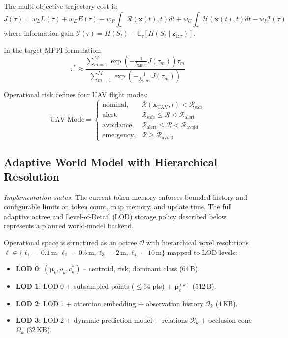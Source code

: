 The multi-objective trajectory cost is:
\begin{equation}
  J(\tau) = w_L L(\tau) + w_E E(\tau) + w_R \int_\tau \mathcal{R}(\mathbf{x}(t), t) dt + w_U \int_\tau \mathcal{U}(\mathbf{x}(t), t) dt - w_I \mathcal{I}(\tau)
\end{equation}
where information gain $\mathcal{I}(\tau) = H(S_t) - \mathbb{E}_\tau[H(S_t \mid \mathbf{z}_{1:\tau})]$.

In the target MPPI formulation:
\begin{equation}
  \tau^* \approx \frac{\sum_{m=1}^M \exp\left(-\frac{1}{\lambda_{\text{MPPI}}} J(\tau_m)\right) \tau_m}{\sum_{m=1}^M \exp\left(-\frac{1}{\lambda_{\text{MPPI}}} J(\tau_m)\right)}
\end{equation}

Operational risk defines four UAV flight modes:
\begin{equation}
  \text{UAV Mode} = \begin{cases}
    \text{nominal}, & \mathcal{R}(\mathbf{x}_{\text{UAV}}, t) < \mathcal{R}_{\text{safe}} \\
    \text{alert}, & \mathcal{R}_{\text{safe}} \le \mathcal{R} < \mathcal{R}_{\text{alert}} \\
    \text{avoidance}, & \mathcal{R}_{\text{alert}} \le \mathcal{R} < \mathcal{R}_{\text{avoid}} \\
    \text{emergency}, & \mathcal{R} \ge \mathcal{R}_{\text{avoid}}
  \end{cases}
\end{equation}

\subsection{Adaptive World Model with Hierarchical Resolution}
\label{subsec:adaptive_world_model}

\emph{Implementation status.} The current token memory enforces bounded history and configurable limits on token count, map memory, and update time. The full adaptive octree and Level-of-Detail (LOD) storage policy described below represents a planned world-model backend.

Operational space is structured as an octree $\mathcal{O}$ with hierarchical voxel resolutions $\ell \in \{\ell_1 = 0.1\,\text{m}, \ell_2 = 0.5\,\text{m}, \ell_3 = 2\,\text{m}, \ell_4 = 10\,\text{m}\}$ mapped to LOD levels:
\begin{itemize}
  \item \textbf{LOD 0}: $(\boldsymbol{\mu}_k, \rho_k, c_k^*)$ -- centroid, risk, dominant class ($64\,\text{B}$).
  \item \textbf{LOD 1}: LOD 0 + subsampled points ($\le 64$ pts) + $\mathbf{p}_c^{(k)}$ ($512\,\text{B}$).
  \item \textbf{LOD 2}: LOD 1 + attention embedding + observation history $\mathcal{O}_k$ ($4\,\text{KB}$).
  \item \textbf{LOD 3}: LOD 2 + dynamic prediction model + relations $\mathcal{R}_k$ + occlusion cone $\Omega_k$ ($32\,\text{KB}$).
\end{itemize}


